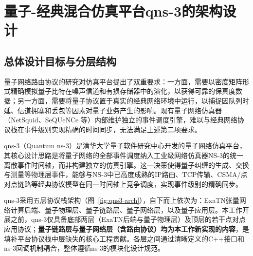 %
%

\chapter{量子-经典混合仿真平台qns-3的架构设计}
\label{chap:qns3-arch}

\section{总体设计目标与分层结构}
\label{sec:arch-overview}

量子网络路由协议的研究对仿真平台提出了双重要求：一方面，需要以密度矩阵形式精确模拟量子比特在噪声信道和有损存储器中的演化，以获得可靠的保真度数据；另一方面，需要将量子协议置于真实的经典网络环境中运行，以捕捉因队列时延、信道拥塞和丢包等因素对量子业务产生的影响。现有量子网络仿真器（NetSquid、SeQUeNCe 等）内部维护独立的事件调度引擎，难以与经典网络协议栈在事件级别实现精确的时间同步，无法满足上述第二项要求。

qns-3（Quantum ns-3）是清华大学量子软件研究中心开发的量子网络仿真平台，其核心设计思路是将量子网络的全部事件调度纳入工业级网络仿真器NS-3\cite{riley2010ns3}的统一离散事件时间轴，而非构建独立的仿真引擎。这一决策使得量子纠缠的生成、交换与测量等物理层事件，能够与NS-3中已高度成熟的IP路由、TCP传输、CSMA/点对点链路等经典协议模型在同一时间轴上竞争调度，实现事件级别的精确同步。

qns-3采用五层协议栈架构（图~\ref{fig:qns3-arch}），自下而上依次为：ExaTN张量网络计算后端、量子物理层、量子链路层、量子网络层，以及量子应用层。本工作开展之前，qns-3仅具备底部两层（ExaTN后端与量子物理层）及顶层的若干点对点应用协议；\textbf{量子链路层与量子网络层（含路由协议）均为本工作新实现的内容}，是填补平台协议栈中层缺失的核心工程贡献。各层之间通过清晰定义的C++接口和ns-3回调机制耦合，整体遵循ns-3的模块化设计规范。

